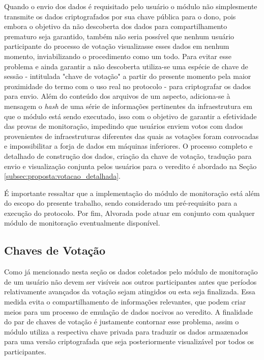 %
Quando o envio dos dados é requisitado pelo usuário o módulo não simplesmente transmite os dados criptografados por sua chave pública para o dono, pois embora o objetivo da não descoberta dos dados para compartilhamento prematuro seja garantido, também não seria possível que nenhum usuário participante do processo de votação visualizasse esses dados em nenhum momento, inviabilizando o procedimento como um todo. Para evitar esse problema e ainda garantir a não descoberta utiliza-se uma espécie de chave de sessão - intitulada "chave de votação" a partir do presente momento pela maior proximidade do termo com o uso real no protocolo - para criptografar os dados para envio. Além do conteúdo dos arquivos de um aspecto, adiciona-se à mensagem o \textit{hash} de uma série de informações pertinentes da infraestrutura em que o módulo está sendo executado, isso com o objetivo de garantir a efetividade das provas de monitoração, impedindo que usuários enviem votos com dados provenientes de infraestruturas diferentes das quais as votações foram convocadas e impossibilitar a forja de dados em máquinas inferiores. O processo completo e detalhado de construção dos dados, criação da chave de votação, tradução para envio e visualização conjunta pelos usuários para o veredito é abordado na Seção \ref{subsec:proposta:votacao_detalhada}.

É importante ressaltar que a implementação do módulo de monitoração está além do escopo do presente trabalho, sendo considerado um pré-requisito para a execução do protocolo.
Por fim, Alvorada pode atuar em conjunto com qualquer módulo de monitoração eventualmente disponível.

\subsection{Chaves de Votação}
\label{subsec:sss}

Como já mencionado nesta seção os dados coletados pelo módulo de monitoração de um usuário não devem ser visíveis aos outros participantes antes que períodos relativamente avançados da votação sejam atingidos ou esta seja finalizada. Essa medida evita o compartilhamento de informações relevantes, que podem criar meios para um processo de emulação de dados nocivos ao veredito. A finalidade do par de chaves de votação é justamente contornar esse problema, assim o módulo utiliza a respectiva chave privada para traduzir os dados armazenados para uma versão criptografada que seja posteriormente visualizável por todos os participantes. 

